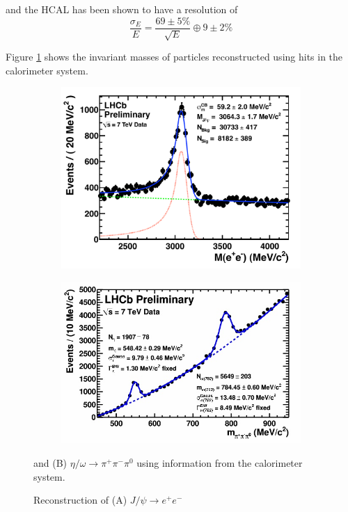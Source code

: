 and the HCAL has been shown to have a resolution of 
\begin{equation*}
	\frac{\sigma_E}{E} = \frac{69\pm5\%}{\sqrt{E}} \oplus 9\pm2\%
\end{equation*}

Figure \ref{fig: reconstruction using calorimeter} shows the invariant masses of particles reconstructed using hits in the calorimeter system.

\begin{figure}
	\centering
	\begin{subfigure}[b]{0.42\textwidth}
		\includegraphics[width=\textwidth]{./Chapters/detector/calorimeter/jpsi_to_ee.pdf}
		\caption{}
	\end{subfigure}
	\begin{subfigure}[b]{0.46\textwidth}
		\includegraphics[width=\textwidth]{./Chapters/detector/calorimeter/eta_omega_pipipi_reconstruction.jpg}
		\caption{}
	\end{subfigure}
	\caption{Reconstruction of (A) $J/\psi \rightarrow e^+e^-$} and (B) $\eta/\omega \rightarrow \pi^+\pi^-\pi^0$ using information from the calorimeter system.
	\label{fig: reconstruction using calorimeter}
\end{figure}
